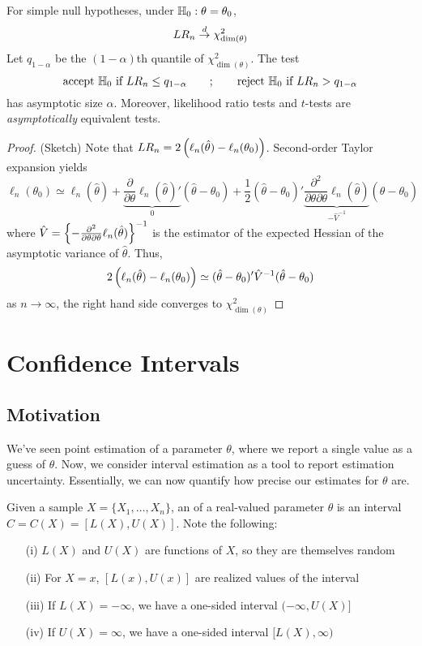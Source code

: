 \documentclass[10pt]{article}
\begin{document}
\begin{theorem}
	 For simple null hypotheses, under $\mathbb{H}_0 : \theta = \theta_0$, 
	\[
	LR_n \overset{d}{\to} \chi^2_{\dim(\theta)}
	\]
	Let $q_{1-\alpha}$ be the $(1-\alpha)$th quantile of $\chi^2_{\dim(\theta)}$. The test
	\[
	\text{accept }\mathbb{H}_0\text{ if }LR_n \le q_{1-\alpha} \qquad ; \qquad \text{reject }\mathbb{H}_0\text{ if }LR_n> q_{1-\alpha}
	\]
	has asymptotic size $\alpha$. Moreover, likelihood ratio tests and $t$-tests are \emph{asymptotically} equivalent tests.
\end{theorem}
\begin{proof}
	(Sketch) Note that $LR_n = 2\left( \ell_n(\hat{\theta}) - \ell_n(\theta_0)\right)$. Second-order Taylor expansion yields
	\[
	\ell_n(\theta_0) \simeq \ell_n(\hat{\theta}) + \underbrace{\frac{\partial}{\partial \theta} \ell_n(\hat{\theta})'}_{0}(\hat{\theta} - \theta_0) + \frac{1}{2}(\hat{\theta} - \theta_0)' \underbrace{\frac{\partial^2}{\partial \theta \partial \theta}\ell_n(\hat{\theta})}_{-\hat{V}^{-1}}(\hat{\theta} - \theta_0)
	\]
	where $\hat{V} = \left\{ - \frac{\partial^2}{\partial\theta\partial\theta} \ell_n(\hat{\theta})\right\}^{-1}$ is the estimator of the expected Hessian of the asymptotic variance of $\hat{\theta}$. Thus,
	\[
	2\left( \ell_n(\hat{\theta}) - \ell_n(\theta_0)\right) \simeq (\hat{\theta} - \theta_0)' \hat{V}^{-1}(\hat{\theta}-\theta_0)
	\]
	as $n \to \infty$, the right hand side converges to $\chi^2_{\dim(\theta)}$
\end{proof}

\newpage

\section{Confidence Intervals}

\subsection{Motivation}

We've seen point estimation of a parameter $\theta$, where we report a single value as a guess of $\theta$. Now, we consider interval estimation as a tool to report estimation uncertainty. Essentially, we can now quantify how precise our estimates for $\theta$ are.

\begin{definition}
	Given a sample $X = \{X_1,\dots,X_n\}$, an  of a real-valued parameter $\theta$ is an interval $C = C(X) = [L(X),U(X)]$. Note the following:
	\begin{itemize}
		\item[(i)] $L(X)$ and $U(X)$ are functions of $X$, so they are themselves random
		\item[(ii)] For $X = x$, $[L(x),U(x)]$ are realized values of the interval 
		\item[(iii)] If $L(X) = -\infty$, we have a one-sided interval $(-\infty,U(X)]$
		\item[(iv)] If $U(X) = \infty$, we have a one-sided interval $[L(X),\infty)$
	\end{itemize}
\end{definition}
\end{document}

